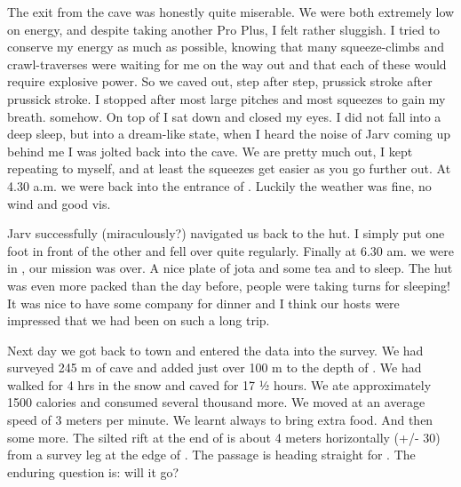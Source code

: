 The exit from the cave was honestly quite miserable. We were both
extremely low on energy, and despite taking another Pro Plus, I felt
rather sluggish. I tried to conserve my energy as much as possible,
knowing that many squeeze-climbs and crawl-traverses were waiting for me
on the way out and that each of these would require explosive power. So
we caved out, step after step, prussick stroke after prussick stroke. I
stopped after most large pitches and most squeezes to gain my breath. 
somehow. On top of  I sat down and closed my eyes. I did not fall
into a deep sleep, but into a dream-like state, when I heard the noise
of Jarv coming up behind me I was jolted back into the cave. We are
pretty much out, I kept repeating to myself, and at least the
squeezes get easier as you go further out. At 4.30 a.m. we were back
into the entrance of . Luckily the weather was fine, no wind
and good vis.

Jarv successfully (miraculously?) navigated us back to the hut. I simply
put one foot in front of the other and fell over quite regularly.
Finally at 6.30 am. we were in , our mission was over. A nice plate
of jota and some tea and to sleep. The hut was even more packed than the
day before, people were taking turns for sleeping! It was nice to have
some company for dinner and I think our hosts were impressed that we had
been on such a long trip.

Next day we got back to town and entered the data into the survey. We
had surveyed 245 m of cave and added just over 100 m to the depth of
. We had walked for 4 hrs in the snow and caved for 17 ½
hours. We ate approximately 1500 calories and consumed several thousand
more. We moved at an average speed of 3 meters per minute. We learnt
always to bring extra food. And then some more. The silted rift at the
end of  is about 4 meters horizontally (+/- 30) from a
survey leg at the edge of . The passage is heading
straight for . The enduring question is: will it go?


